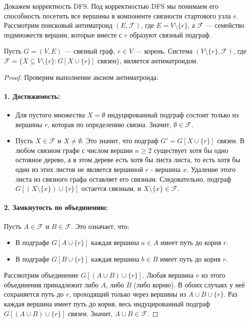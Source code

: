 \begin{tcolorbox}[colback=gray!5!white, colframe=gray!75!black]
Докажем корректность DFS. Под корректностью DFS мы понимаем его способность посетить все вершины в компоненте связности стартового узла $r$. Рассмотрим поисковый антиматроид $(E, \mathcal{F})$, где $E = V \setminus \{r\}$, а $\mathcal{F}$ — семейство подмножеств вершин, которые вместе с $r$ образуют связный подграф.

\begin{lemma}
Пусть $G=(V, E)$ — связный граф, $r \in V$ — корень. Система $(V \setminus \{r\}, \mathcal{F})$, где $\mathcal{F} = \{X \subseteq V \setminus \{r\} : G[X \cup \{r\}] \text{ связен}\}$, является антиматроидом.
\end{lemma}

\begin{proof}
Проверим выполнение аксиом антиматроида:

\paragraph{1. Достижимость:}
\begin{itemize}
    \item Для пустого множества $X = \emptyset$ индуцированный подграф состоит только из вершины $r$, которая по определению связна. Значит, $\emptyset \in \mathcal{F}$.
    \item Пусть $X \in \mathcal{F}$ и $X \neq \emptyset$. Это значит, что подграф $G' = G[X \cup \{r\}]$ связен. В любом связном графе с числом вершин $n \geq 2$ существует хотя бы одно остовное дерево, а в этом дереве есть хотя бы листа листа, то есть хотя бы один из этих листов не является вершиной $r$ - вершина $x$.  Удаление этого листа из связного графа оставляет его связным. Следовательно, подграф $G[ (X \setminus \{x\}) \cup \{r\} ]$ остается связным, и $X \setminus \{x\} \in \mathcal{F}$. 
\end{itemize}

\paragraph{2. Замкнутость по объединению:}
Пусть $A \in \mathcal{F}$ и $B \in \mathcal{F}$. Это означает, что:
\begin{itemize}
    \item В подграфе $G[A \cup \{r\}]$ каждая вершина $a \in A$ имеет путь до корня $r$.
    \item В подграфе $G[B \cup \{r\}]$ каждая вершина $b \in B$ имеет путь до корня $r$.
\end{itemize}
Рассмотрим объединение $G[(A \cup B) \cup \{r\}]$. Любая вершина $v$ из этого объединения принадлежит либо $A$, либо $B$ (либо корню). В обоих случаях у неё сохраняется путь до $r$, проходящий только через вершины из $A \cup B \cup \{r\}$. Раз каждая вершина имеет путь до корня, весь индуцированный подграф $G[(A \cup B) \cup \{r\}]$ связен. Значит, $A \cup B \in \mathcal{F}$.
\end{proof}


\end{tcolorbox}
